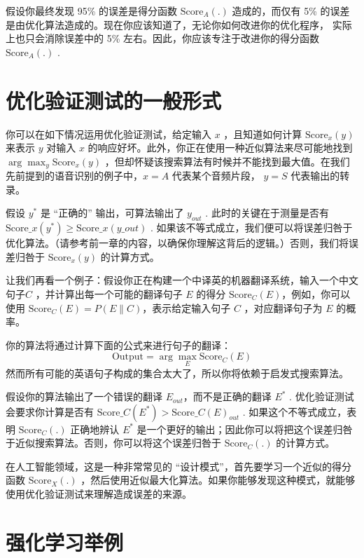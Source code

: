 假设你最终发现 95\% 的误差是得分函数 \(\text{Score}_A (.)\)
造成的，而仅有 5\%
的误差是由优化算法造成的。现在你应该知道了，无论你如何改进你的优化程序，
实际上也只会消除误差中的 5\% 左右。因此，你应该专注于改进你的得分函数
\(\text{Score}_A (.)\) .

\hypertarget{ux4f18ux5316ux9a8cux8bc1ux6d4bux8bd5ux7684ux4e00ux822cux5f62ux5f0f}{%
\chapter{优化验证测试的一般形式}\label{ux4f18ux5316ux9a8cux8bc1ux6d4bux8bd5ux7684ux4e00ux822cux5f62ux5f0f}}

你可以在如下情况运用优化验证测试，给定输入 \(x\) ，且知道如何计算
\(\text{Score}_x (y)\) 来表示 \(y\) 对输入 \(x\)
的响应好坏。此外，你正在使用一种近似算法来尽可能地找到\(\arg \max_y \text{Score}_x(y)\)
，但却怀疑该搜索算法有时候并不能找到最大值。在我们先前提到的语音识别的例子中，\(x=A\)
代表某个音频片段， \(y=S\) 代表输出的转录。

假设 \(y^*​\) 是 ``正确的'' 输出，可算法输出了 \(y_{out}​\) .
此时的关键在于测量是否有
\(\text{Score}\_x(y^*) \ge \text{Score}\_x(y\_{out})​\) .
如果该不等式成立，我们便可以将误差归咎于优化算法。（请参考前一章的内容，以确保你理解这背后的逻辑。）否则，我们将误差归咎于
\(\text{Score}_x (y)​\) 的计算方式。

让我们再看一个例子：假设你正在构建一个中译英的机器翻译系统，输入一个中文句子\(C\)
，并计算出每一个可能的翻译句子 \(E\) 的得分
\(\text{Score}_C(E)\)，例如，你可以使用
\(\text{Score}_C(E)=P(E\|C)\)，表示给定输入句子 \(C\) ，对应翻译句子为
\(E\) 的概率。

你的算法将通过计算下面的公式来进行句子的翻译： \[
\text{Output}=\arg \max_E \text{Score}_C(E)
\]
然而所有可能的英语句子构成的集合太大了，所以你将依赖于启发式搜索算法。

假设你的算法输出了一个错误的翻译 \(E_{out}​\)，而不是正确的翻译 \(E^*​\) .
优化验证测试会要求你计算是否有
\(\text{Score}\_C (E^*) \gt \text{Score}\_C (E)_{out}​\) .
如果这个不等式成立，表明 \(\text{Score}_C(.)​\) 正确地辨认 \(E^*​\)
是一个更好的输出；因此你可以将把这个误差归咎于近似搜索算法。否则，你可以将这个误差归咎于
\(\text{Score}_C(.)​\) 的计算方式。

在人工智能领域，这是一种非常常见的
``设计模式''，首先要学习一个近似的得分函数 \(\text{Score}_X(.)\)
，然后使用近似最大化算法。如果你能够发现这种模式，就能够使用优化验证测试来理解造成误差的来源。

\hypertarget{ux5f3aux5316ux5b66ux4e60ux4e3eux4f8b}{%
\chapter{强化学习举例}\label{ux5f3aux5316ux5b66ux4e60ux4e3eux4f8b}}

